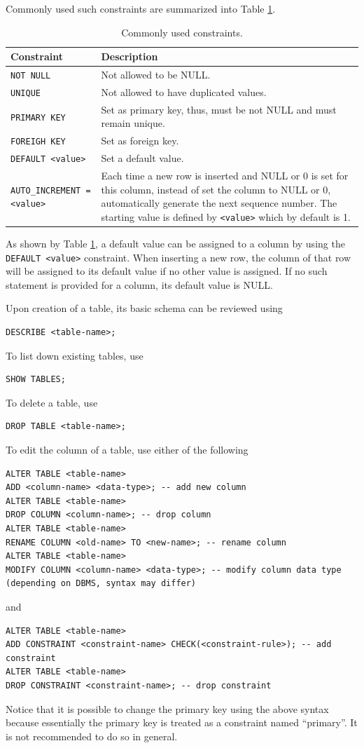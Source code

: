Commonly used such constraints are summarized into Table \ref{ch:db:tab:constraints}.
\begin{table}
	\centering \caption{Commonly used constraints.}\label{ch:db:tab:constraints}
	\begin{tabularx}{\textwidth}{lX}
		\hline
		Constraint & Description \\ \hline
		\verb|NOT NULL| & Not allowed to be NULL. \\ \hdashline
		\verb|UNIQUE| & Not allowed to have duplicated values. \\ \hdashline
        \verb|PRIMARY KEY| & Set as primary key, thus, must be not NULL and must remain unique. \\ \hdashline
        \verb|FOREIGH KEY| & Set as foreign key. \\ \hdashline
        \verb|DEFAULT <value>| & Set a default value. \\ \hdashline
        \verb|AUTO_INCREMENT = <value>| & Each time a new row is inserted and NULL or 0 is set for this column, instead of set the column to NULL or 0, automatically generate the next sequence number. The starting value is defined by \verb|<value>| which by default is 1. \\
		 \hline
	\end{tabularx}
\end{table}
As shown by Table \ref{ch:db:tab:constraints}, a default value can be assigned to a column by using the \verb|DEFAULT <value>| constraint. When inserting a new row, the column of that row will be assigned to its default value if no other value is assigned. If no such statement is provided for a column, its default value is NULL.

Upon creation of a table, its basic schema can be reviewed using
\begin{lstlisting}
DESCRIBE <table-name>;
\end{lstlisting}
To list down existing tables, use
\begin{lstlisting}
SHOW TABLES;
\end{lstlisting}
To delete a table, use
\begin{lstlisting}
DROP TABLE <table-name>;
\end{lstlisting}

To edit the column of a table, use either of the following
\begin{lstlisting}
ALTER TABLE <table-name>
ADD <column-name> <data-type>; -- add new column
ALTER TABLE <table-name>
DROP COLUMN <column-name>; -- drop column
ALTER TABLE <table-name>
RENAME COLUMN <old-name> TO <new-name>; -- rename column
ALTER TABLE <table-name>
MODIFY COLUMN <column-name> <data-type>; -- modify column data type (depending on DBMS, syntax may differ)
\end{lstlisting}
and
\begin{lstlisting}
ALTER TABLE <table-name>
ADD CONSTRAINT <constraint-name> CHECK(<constraint-rule>); -- add constraint
ALTER TABLE <table-name>
DROP CONSTRAINT <constraint-name>; -- drop constraint
\end{lstlisting}
Notice that it is possible to change the primary key using the above syntax because essentially the primary key is treated as a constraint named ``primary''. It is not recommended to do so in general.

